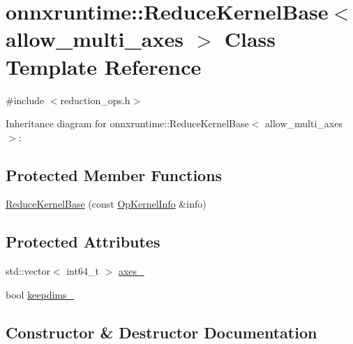 \hypertarget{classonnxruntime_1_1ReduceKernelBase}{}\section{onnxruntime\+:\+:Reduce\+Kernel\+Base$<$ allow\+\_\+multi\+\_\+axes $>$ Class Template Reference}
\label{classonnxruntime_1_1ReduceKernelBase}


{\ttfamily \#include $<$reduction\+\_\+ops.\+h$>$}



Inheritance diagram for onnxruntime\+:\+:Reduce\+Kernel\+Base$<$ allow\+\_\+multi\+\_\+axes $>$\+:
\subsection*{Protected Member Functions}
\begin{DoxyCompactItemize}
\item 
\mbox{\hyperlink{classonnxruntime_1_1ReduceKernelBase_a62c47762cb3a280764b96e071f7c9056}{Reduce\+Kernel\+Base}} (const \mbox{\hyperlink{classonnxruntime_1_1OpKernelInfo}{Op\+Kernel\+Info}} \&info)
\end{DoxyCompactItemize}
\subsection*{Protected Attributes}
\begin{DoxyCompactItemize}
\item 
std\+::vector$<$ int64\+\_\+t $>$ \mbox{\hyperlink{classonnxruntime_1_1ReduceKernelBase_a003cd886af34dd5ecb6bc5244e8c9ff6}{axes\+\_\+}}
\item 
bool \mbox{\hyperlink{classonnxruntime_1_1ReduceKernelBase_aa8eea3f720a6238356a38e487a0365af}{keepdims\+\_\+}}
\end{DoxyCompactItemize}


\subsection{Constructor \& Destructor Documentation}
\mbox{\label{classonnxruntime_1_1ReduceKernelBase_a62c47762cb3a280764b96e071f7c9056}} 
